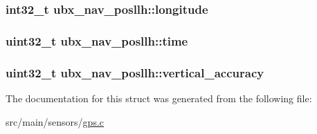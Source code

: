 \hypertarget{structubx__nav__posllh_a1ec90e9cd76ecb065afcbb475c20b869}{
\subsubsection[{longitude}]{\setlength{\rightskip}{0pt plus 5cm}int32\+\_\+t ubx\+\_\+nav\+\_\+posllh\+::longitude}}\label{structubx__nav__posllh_a1ec90e9cd76ecb065afcbb475c20b869}
\hypertarget{structubx__nav__posllh_abd088973260a28540a363b43313752de}{
\subsubsection[{time}]{\setlength{\rightskip}{0pt plus 5cm}uint32\+\_\+t ubx\+\_\+nav\+\_\+posllh\+::time}}\label{structubx__nav__posllh_abd088973260a28540a363b43313752de}
\hypertarget{structubx__nav__posllh_ad3a1770b51e7db0d2d0153423b029965}{
\subsubsection[{vertical\+\_\+accuracy}]{\setlength{\rightskip}{0pt plus 5cm}uint32\+\_\+t ubx\+\_\+nav\+\_\+posllh\+::vertical\+\_\+accuracy}}\label{structubx__nav__posllh_ad3a1770b51e7db0d2d0153423b029965}


The documentation for this struct was generated from the following file\+:\begin{DoxyCompactItemize}
\item 
src/main/sensors/\hyperlink{gps_8c}{gps.\+c}\end{DoxyCompactItemize}
